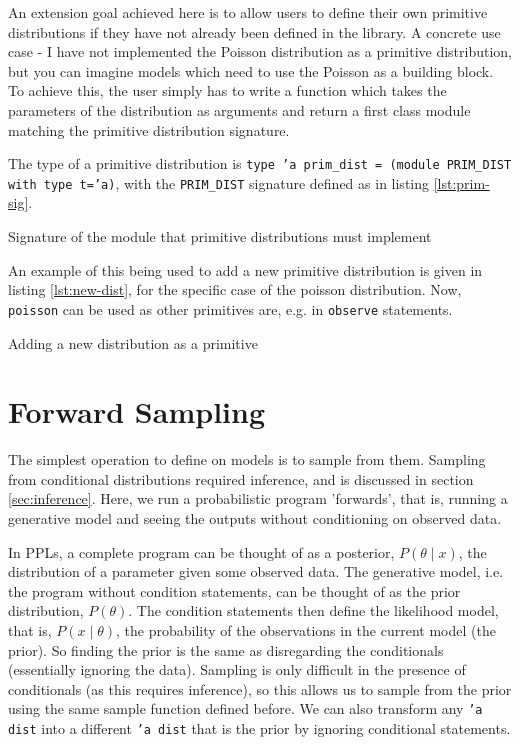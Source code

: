 An extension goal achieved here is to allow users to define their own primitive distributions if they have not already been defined in the library. A concrete use case - I have not implemented the Poisson distribution as a primitive distribution, but you can imagine models which need to use the Poisson as a building block. To achieve this, the user simply has to write a function which takes the parameters of the distribution as arguments and return a first class module matching the primitive distribution signature.

The type of a primitive distribution is \texttt{type 'a prim\_dist = (module PRIM\_DIST with type t='a)}, with the \texttt{PRIM\_DIST} signature defined as in listing \ref{lst:prim-sig}. 

\begin{listing}[!ht]
	\caption{Signature of the module that primitive distributions must implement}
	\label{lst:prim-sig}
\end{listing}

An example of this being used to add a new primitive distribution is given in listing \ref{lst:new-dist}, for the specific case of the poisson distribution. Now, \texttt{poisson} can be used as other primitives are, e.g. in \texttt{observe} statements.

\begin{listing}[!ht]
	\caption{Adding a new distribution as a primitive}
	\label{lst:new-dist}
\end{listing}

\section{Forward Sampling}
The simplest operation to define on models is to sample from them. Sampling from conditional distributions required inference, and is discussed in section \ref{sec:inference}. Here, we run a probabilistic program 'forwards', that is, running a generative model and seeing the outputs without conditioning on observed data.

In PPLs, a complete program can be thought of as a posterior, $P(\theta\mid x)$, the distribution of a parameter given some observed data. The generative model, i.e. the program without condition statements, can be thought of as the prior distribution, $P(\theta)$. The condition statements then define the likelihood model, that is, $P(x\mid \theta)$, the probability of the observations in the current model (the prior). So finding the prior is the same as disregarding the conditionals (essentially ignoring the data). Sampling is only difficult in the presence of conditionals (as this requires inference), so this allows us to sample from the prior using the same sample function defined before. We can also transform any \texttt{'a dist} into a different \texttt{'a dist} that is the prior by ignoring conditional statements.

